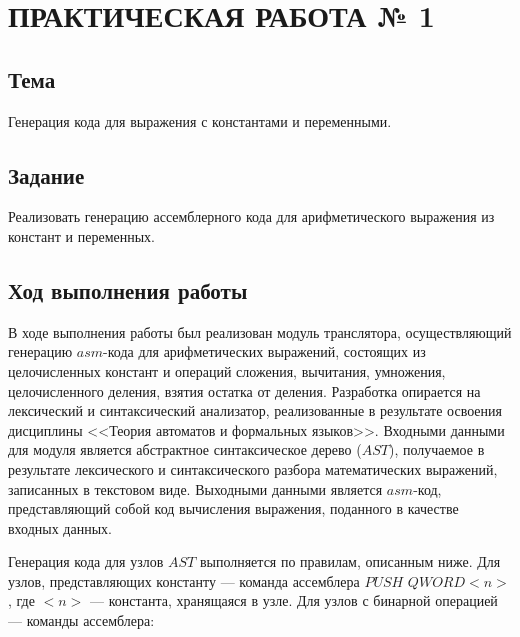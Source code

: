 \chapter{ПРАКТИЧЕСКАЯ РАБОТА № 1}

\section{Тема}

Генерация кода для выражения с константами и переменными.

\section{Задание}

Реализовать генерацию ассемблерного кода для арифметического выражения из констант и переменных.

\section{Ход выполнения работы}

В ходе выполнения работы был реализован модуль транслятора, осуществляющий генерацию $asm$-кода для арифметических выражений, состоящих из целочисленных констант и операций сложения, вычитания, умножения, целочисленного деления, взятия остатка от деления. Разработка опирается на лексический и синтаксический анализатор, реализованные в результате освоения дисциплины <<Теория автоматов и формальных языков>>. Входными данными для модуля является абстрактное синтаксическое дерево ($AST$), получаемое в результате лексического и синтаксического разбора математических выражений, записанных в текстовом виде. Выходными данными является $asm$-код, представляющий собой код вычисления выражения, поданного в качестве входных данных.

Генерация кода для узлов $AST$ выполняется по правилам, описанным ниже. Для узлов, представляющих константу --- команда ассемблера $PUSH$ $QWORD <n>$, где $<n>$ --- константа, хранящаяся в узле. Для узлов с бинарной операцией --- команды ассемблера:

